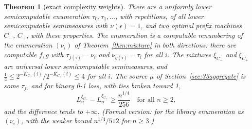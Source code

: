 \documentclass[11pt]{article}
\newcommand{\eps}{\epsilon}
\newtheorem{theorem}{Theorem}[section]
\theoremstyle{definition}
\theoremstyle{remark}
\begin{document}
\begin{theorem}[exact complexity weights]\label{thm:exact}
There are a uniformly lower semicomputable enumeration
$\tau_0,\tau_1,\dots$, with repetitions, of all lower semicomputable
semimeasures with $\nu(\eps)=1$, and two optimal prefix machines $C_-$, $C_+$,
with these properties. The enumeration is a computable renumbering of the
enumeration $(\nu_i)$ of Theorem~\ref{thm:mixture} in both directions: there
are computable $f,g$ with $\tau_{f(i)}=\nu_i$ and $\nu_{g(i)}=\tau_i$ for all
$i$. The mixtures $\xi_{C_-}$ and $\xi_{C_+}$ are universal lower
semicomputable semimeasures, and
$\frac14\le2^{-K_{C_-}(i)}/2^{-K_{C_+}(i)}\le4$ for all $i$. The source $\mu$
of Section~\ref{sec:33aggregate} is some $\tau_j$, and for binary 0-1 loss,
with ties broken toward 1,
\[
L_n^{\xi_{C_-}}-L_n^{\xi_{C_+}}\ge\frac{n^{1/4}}{256}\quad\text{for all }n\ge2,
\]
and the difference tends to $+\infty$. (Formal version: for the library
enumeration as $(\nu_i)$, with the weaker bound $n^{1/4}/512$ for $n\ge3$.)
\end{theorem}
\end{document}
